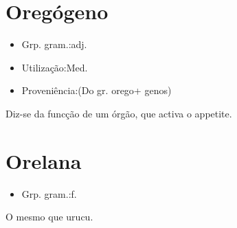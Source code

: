 \section{Oregógeno}
\begin{itemize}
\item {Grp. gram.:adj.}
\end{itemize}
\begin{itemize}
\item {Utilização:Med.}
\end{itemize}
\begin{itemize}
\item {Proveniência:(Do gr. \textunderscore orego\textunderscore  + \textunderscore genos\textunderscore )}
\end{itemize}
Diz-se da funcção de um órgão, que activa o appetite.
\section{Orelana}
\begin{itemize}
\item {Grp. gram.:f.}
\end{itemize}
O mesmo que \textunderscore urucu\textunderscore .
